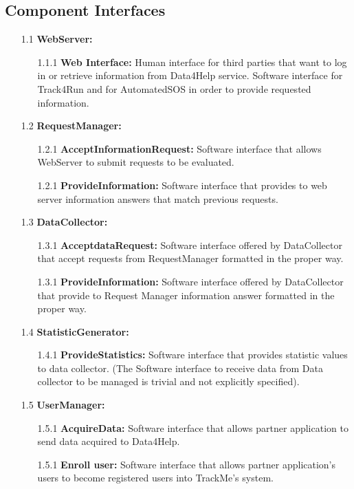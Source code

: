 \subsection{Component Interfaces}

\begin{enumerate}

\item[1.1] \textbf{WebServer: }
	\begin{enumerate}
		\item[1.1.1] \textbf{Web Interface:} Human interface for third parties that want to log in or retrieve information from Data4Help service. Software interface for Track4Run and for AutomatedSOS in order to provide requested information.
	\end{enumerate}
	
\item[1.2] \textbf{RequestManager: }
	\begin{enumerate}
		\item[1.2.1] \textbf{AcceptInformationRequest:} Software interface that allows WebServer to submit requests to be evaluated.
		\item[1.2.1] \textbf{ProvideInformation:} Software interface that provides to web server information answers that match previous requests.
	\end{enumerate}

\item[1.3] \textbf{DataCollector: }
	\begin{enumerate}
		\item[1.3.1] \textbf{AcceptdataRequest:} Software interface offered by DataCollector that accept requests from RequestManager formatted in the proper way.
		\item[1.3.1] \textbf{ProvideInformation:} Software interface offered by DataCollector that provide to Request Manager information answer formatted in the proper way.
	\end{enumerate}
	
\item[1.4] \textbf{StatisticGenerator: }
	\begin{enumerate}
		\item[1.4.1] \textbf{ProvideStatistics:} Software interface that provides statistic values to data collector. (The Software interface to receive data from Data collector to be managed is trivial and not explicitly specified).
	\end{enumerate}
	
\item[1.5] \textbf{UserManager: }
	\begin{enumerate}
		\item[1.5.1] \textbf{AcquireData:} Software interface that allows partner application to send data acquired to Data4Help.
		\item[1.5.1] \textbf{Enroll user:} Software interface that allows partner application's users to become registered users into TrackMe's system.
	\end{enumerate}


\end{enumerate}
